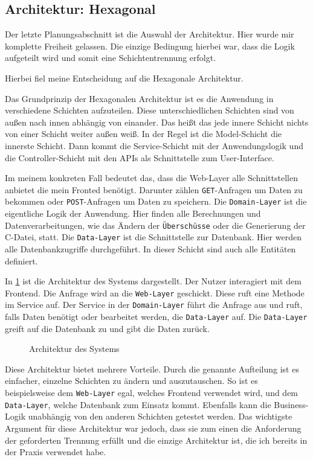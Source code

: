 \subsection{Architektur: Hexagonal}
Der letzte Planungsabschnitt ist die Auswahl der Architektur. Hier wurde mir komplette Freiheit gelassen.
Die einzige Bedingung hierbei war, dass die Logik aufgeteilt wird und somit eine Schichtentrennung erfolgt.

Hierbei fiel meine Entscheidung auf die Hexagonale Architektur.

Das Grundprinzip der Hexagonalen Architektur ist es die Anwendung in verschiedene Schichten aufzuteilen.
Diese unterschiedlichen Schichten sind von außen nach innen abhängig von einander. Das heißt das jede innere Schicht nichts von einer Schicht weiter außen weiß.
In der Regel ist die Model-Schicht die innerste Schicht.
Dann kommt die Service-Schicht mit der Anwendungslogik und die Controller-Schicht mit den APIs als Schnittstelle zum User-Interface.

Im meinem konkreten Fall bedeutet das, dass die Web-Layer alle Schnittstellen anbietet die mein Fronted benötigt. Darunter zählen \texttt{GET}-Anfragen um Daten zu bekommen oder
\texttt{POST}-Anfragen um Daten zu speichern.
Die \texttt{Domain-Layer} ist die eigentliche Logik der Anwendung. Hier finden alle Berechnungen und Datenverarbeitungen, wie das Ändern der \texttt{Überschüsse} oder die Generierung der C-Datei, statt.
Die \texttt{Data-Layer} ist die Schnittstelle zur Datenbank. Hier werden alle Datenbankzugriffe durchgeführt. In dieser Schicht sind auch alle Entitäten definiert.

In \ref{fig:architecture} ist die Architektur des Systems dargestellt. Der Nutzer interagiert mit dem Frontend. Die Anfrage wird an die \texttt{Web-Layer} geschickt. 
Diese ruft eine Methode im Service auf. Der Service in der \texttt{Domain-Layer} führt die Anfrage aus und ruft, falls Daten benötigt oder bearbeitet werden, die \texttt{Data-Layer} auf.
Die \texttt{Data-Layer} greift auf die Datenbank zu und gibt die Daten zurück.

\begin{figure}[htbp]
  \resizebox{\textwidth}{!}{}
  \caption{Architektur des Systems}
  \label{fig:architecture}
\end{figure}

Diese Architektur bietet mehrere Vorteile. Durch die genannte Aufteilung ist es einfacher, einzelne Schichten zu ändern und auszutauschen. 
So ist es beispielsweise dem \texttt{Web-Layer} egal, welches Frontend verwendet wird, und dem \texttt{Data-Layer}, welche Datenbank zum Einsatz kommt.
Ebenfalls kann die Business-Logik unabhängig von den anderen Schichten getestet werden.
Das wichtigste Argument für diese Architektur war jedoch, dass sie zum einen die Anforderung der geforderten Trennung erfüllt und die einzige Architektur ist, die ich bereits in der Praxis verwendet habe.
